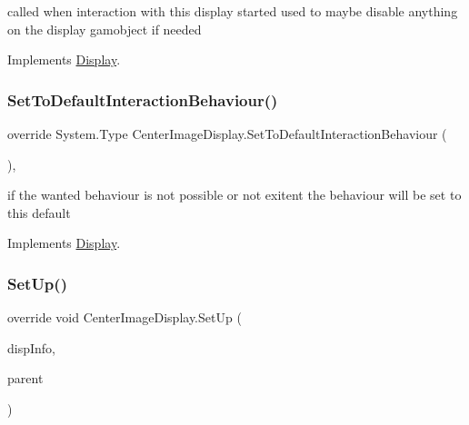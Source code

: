 called when interaction with this display started used to maybe disable anything on the display gamobject if needed 



Implements \mbox{\hyperlink{class_display_a21c51fcf185403197a78a5acfd2065de}{Display}}.

\mbox{\label{class_center_image_display_ac6ddf9c8df99ff76c0f508ba4e45a217}} 
\subsubsection{\texorpdfstring{Set\+To\+Default\+Interaction\+Behaviour()}{SetToDefaultInteractionBehaviour()}}
{\footnotesize\ttfamily override System.\+Type Center\+Image\+Display.\+Set\+To\+Default\+Interaction\+Behaviour (\begin{DoxyParamCaption}{ }\end{DoxyParamCaption})\hspace{0.3cm}{\ttfamily [protected]}, {\ttfamily [virtual]}}



if the wanted behaviour is not possible or not exitent the behaviour will be set to this default 



Implements \mbox{\hyperlink{class_display_a81f07350cf50b3924f4fe269e1b4cf17}{Display}}.

\mbox{\label{class_center_image_display_a3da996020c7d8abcd24f35660945703a}} 
\subsubsection{\texorpdfstring{Set\+Up()}{SetUp()}}
{\footnotesize\ttfamily override void Center\+Image\+Display.\+Set\+Up (\begin{DoxyParamCaption}\item[{\mbox{\hyperlink{class_museum_display_info}{Museum\+Display\+Info}}}]{disp\+Info,  }\item[{Game\+Object}]{parent }\end{DoxyParamCaption})\hspace{0.3cm}{\ttfamily [virtual]}}



